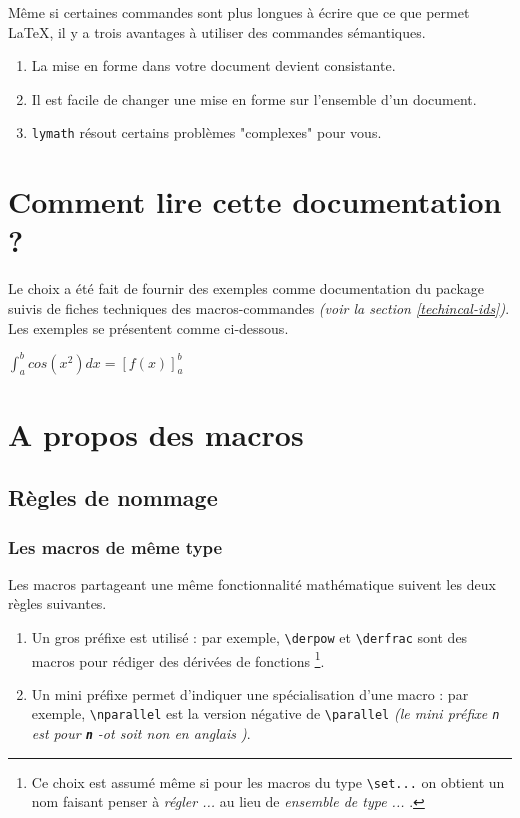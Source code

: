 \documentclass[12pt,a4paper]{article}
\newcommand\env[1]{\texttt{#1}}
\newcommand\macro[1]{\env{\textbackslash{}#1}}
\theoremstyle{definition}
\newcommand\whyprefix[2]{%
	\textbf{\prefix{#1}}-#2%
}
\newcommand\prefix[1]{%
	\texttt{#1}%
}
\newcommand\inenglish[1]{%
	\emph{\og #1 \fg} en anglais%
}
\begin{document}
Même si certaines commandes sont plus longues à écrire que ce que permet \LaTeX{}, il y a trois avantages à utiliser des commandes sémantiques.
\begin{enumerate}
	\item La mise en forme dans votre document devient consistante.

	\item Il est facile de changer une mise en forme sur l'ensemble d'un document.

	\item \verb+lymath+ résout certains problèmes "complexes" pour vous.
\end{enumerate}




\section{Comment lire cette documentation ?}

Le choix a été fait de fournir des exemples comme documentation du package suivis de fiches techniques des macros-commandes \emph{(voir la section \ref{techincal-ids})}. Les exemples se présentent comme ci-dessous.

\begin{latexex}
$ \displaystyle
  \int_a^b cos(x^2) dx
= \left[ f(x) \right]_a^b$
\end{latexex}




\section{A propos des macros}

\subsection{Règles de nommage}

\subsubsection{Les macros de même \og type \fg}

Les macros partageant une même fonctionnalité mathématique suivent les deux règles suivantes.
\begin{enumerate}
	\item Un gros préfixe est utilisé : 
	      par exemple, \macro{derpow} et \macro{derfrac} sont des macros pour rédiger des dérivées de fonctions
	      \footnote{
	      	Ce choix est assumé même si pour les macros du type \macro{set...} on obtient un nom faisant penser à \emph{\og régler ... \fg} au lieu de \emph{\og ensemble de type ... \fg}.
		  }.

	\item Un mini préfixe permet d'indiquer une spécialisation d'une macro : 
	      par exemple, \macro{nparallel} est la version négative de \macro{parallel} \emph{(le mini préfixe \prefix{n} est pour \whyprefix{n}{ot} soit \inenglish{non})}.
\end{enumerate}
\end{document}
